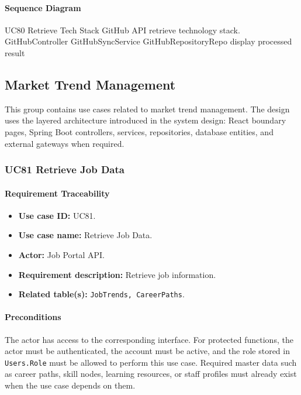 \paragraph{Sequence Diagram}

\SequenceDiagram
{UC80 Retrieve Tech Stack}
{GitHub API}
{retrieve technology stack.}
{GitHubController}
{GitHubSyncService}
{GitHubRepositoryRepo}
{display processed result}

\subsection{Market Trend Management}

This group contains use cases related to market trend management. The design uses the layered architecture introduced in the system design: React boundary pages, Spring Boot controllers, services, repositories, database entities, and external gateways when required.

\subsubsection{UC81 Retrieve Job Data}

\paragraph{Requirement Traceability}

\begin{itemize}
    \item \textbf{Use case ID:} UC81.
    \item \textbf{Use case name:} Retrieve Job Data.
    \item \textbf{Actor:} Job Portal API.
    \item \textbf{Requirement description:} Retrieve job information.
    \item \textbf{Related table(s):} \texttt{JobTrends, CareerPaths}.
\end{itemize}

\paragraph{Preconditions}

The actor has access to the corresponding interface. For protected functions, the actor must be authenticated, the account must be active, and the role stored in \texttt{Users.Role} must be allowed to perform this use case. Required master data such as career paths, skill nodes, learning resources, or staff profiles must already exist when the use case depends on them.

